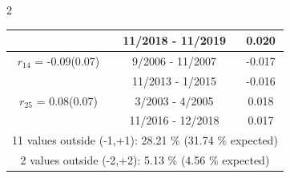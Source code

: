 \begin{multicols}{2}
{\begin{tabular}{ccc}
&       11/2018 - 11/2019 &        0.020  \vspace{-.02in} \\ \hline 
  $r_{14}$ = -0.09(0.07) &       9/2006 - 11/2007 &       -0.017    \vspace{-.10in} \\ 
  &       11/2013 -  1/2015 &       -0.016  \vspace{-.02in}   \\ \hline 
    $r_{25}$ = 0.08(0.07) &       3/2003 -  4/2005 &        0.018   \vspace{-.10in} \\  
&       11/2016 - 12/2018 &        0.017  \vspace{-.02in} \\ \hline 
\multicolumn{3}{c}{              11 values outside (-1,+1): 28.21  \% (31.74  \% expected)}\vspace{-.10in} \\ 
\multicolumn{3}{c}{               2 values outside (-2,+2):  5.13 \%  (4.56 \% expected) } \\
 \end{tabular} \\ 
 } 
\end{multicols} 

